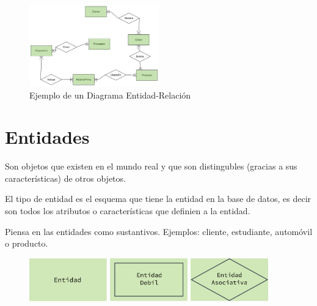 \documentclass[12pt, fleqn]{report}                             %
\theoremstyle{break}                                            %
\begin{document}
            \begin{figure}[h]
                \centering
                \includegraphics[width=0.50\textwidth]{ER-Diagram}
                \caption{Ejemplo de un Diagrama Entidad-Relación}
            \end{figure}



        \clearpage
        \section{Entidades}
                
            Son objetos que existen en el mundo real y que son distingubles
            (gracias a sus características) de otros objetos.

            El tipo de entidad es el esquema que tiene la entidad en la base de datos,
            es decir son todos los atributos o características que definien a la entidad.

            Piensa en las entidades como sustantivos.
            Ejemplos: cliente, estudiante, automóvil o producto. 


            \begin{figure}[h]
                \centering
                \includegraphics[width=0.30\textwidth]{Entidad}
                \includegraphics[width=0.30\textwidth]{EntidadDebil}
                \includegraphics[width=0.30\textwidth]{EntidadAsociativa}
            \end{figure}
\end{document}
